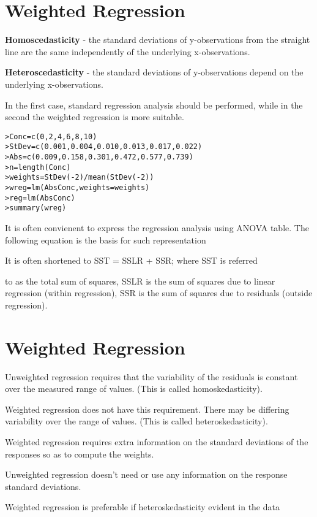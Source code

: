 \documentclass[a4paper,12pt]{article}
\begin{document}
\section{Weighted Regression}

\textbf{Homoscedasticity} - the standard deviations of
y-observations from the straight line are the same independently
of the underlying x-observations.

\textbf{Heteroscedasticity} - the standard deviations of
y-observations depend on the underlying x-observations.

In the first case, standard regression analysis should be
performed, while in the second the weighted regression is more
suitable.

\begin{verbatim}
>Conc=c(0,2,4,6,8,10)
>StDev=c(0.001,0.004,0.010,0.013,0.017,0.022)
>Abs=c(0.009,0.158,0.301,0.472,0.577,0.739)
>n=length(Conc)
>weights=StDev(-2)/mean(StDev(-2))
>wreg=lm(AbsConc,weights=weights)
>reg=lm(AbsConc)
>summary(wreg)
\end{verbatim}


It is often convienent to express the regression analysis using
ANOVA table. The following equation is the basis for such
representation

It is often shortened to SST = SSLR + SSR; where SST is referred

to as the total sum of squares, SSLR is the sum of squares due to
linear regression (within regression), SSR is the sum of squares
due to residuals (outside regression).

\section{Weighted Regression}
Unweighted regression requires that the variability of the
residuals is constant over the measured range of values.
(This is called homoskedasticity).

Weighted regression does not have this requirement.
There may be differing variability over the range of values.
(This is called heteroskedasticity).

Weighted regression requires extra information on the standard deviations of the responses so as to compute the weights.

Unweighted regression doesn’t need or use any information on the response standard deviations.

Weighted regression is preferable if heteroskedasticity evident in the data
\end{document}
